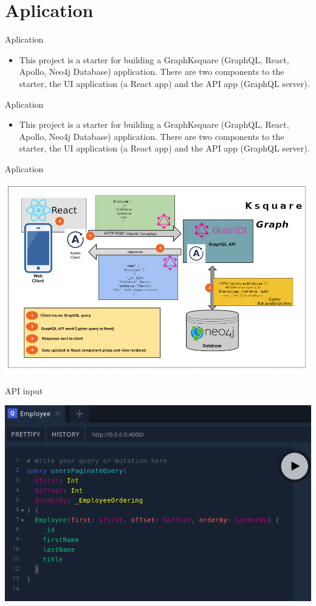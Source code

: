 \documentclass{beamer}
\begin{document}
\section{Aplication}

\begin{frame}{Aplication}{ }
\begin{itemize}
	\item This project is a starter for building a GraphKsquare (GraphQL, React, Apollo, Neo4j Database) application. There are two components to the starter, the UI application (a React app) and the API app (GraphQL server).
\end{itemize}
\end{frame}

\begin{frame}{Aplication}{ }
\begin{itemize}
	\item This project is a starter for building a GraphKsquare (GraphQL, React, Apollo, Neo4j Database) application. There are two components to the starter, the UI application (a React app) and the API app (GraphQL server).
\end{itemize}
\end{frame}

\begin{frame}{Aplication}{ }

\begin{center}
	\includegraphics[width=0.7\linewidth]{img/neoapographqla.png}
\end{center}
\end{frame}


\begin{frame}{API input}{ }

\begin{center}
	\includegraphics[width=0.7\linewidth]{img/graphqlinput.png}
\end{center}
\end{frame}
\end{document}
